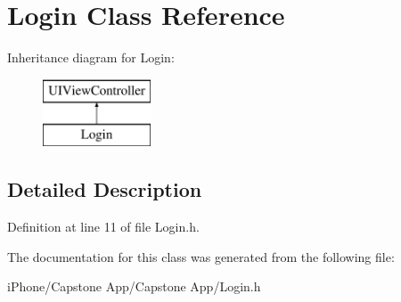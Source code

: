 \hypertarget{interface_login}{\section{Login Class Reference}
\label{interface_login}
}
Inheritance diagram for Login\-:\begin{figure}[H]
\begin{center}
\leavevmode
\includegraphics[height=2.000000cm]{interface_login}
\end{center}
\end{figure}


\subsection{Detailed Description}


Definition at line 11 of file Login.\-h.



The documentation for this class was generated from the following file\-:\begin{DoxyCompactItemize}
\item 
i\-Phone/\-Capstone App/\-Capstone App/Login.\-h\end{DoxyCompactItemize}

